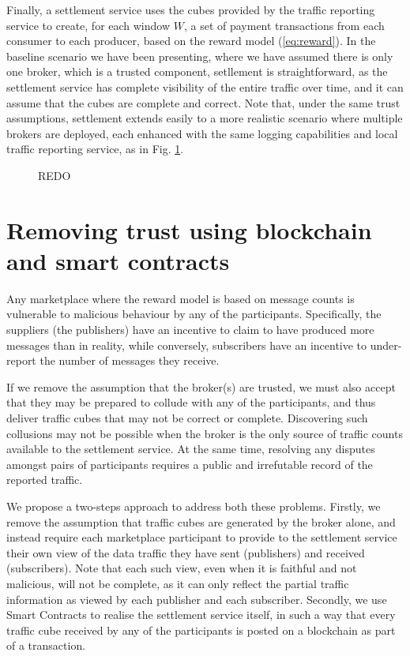 \documentclass[conference]{IEEEtran}
\begin{document}
Finally, a settlement service uses the cubes provided by the traffic reporting service to create, for each window $ W $, a set of payment transactions from each consumer to each producer, based on the reward model (\ref{eq:reward}).
In the baseline scenario we have been presenting, where we have assumed there is only one broker, which is a trusted component, setllement is straightforward, as the settlement service has complete visibility of the entire traffic over time, and it can assume that the cubes are complete and correct.
Note that, under the same trust assumptions, settlement extends easily to a more realistic scenario where multiple brokers are deployed, each enhanced with the same logging capabilities and local traffic reporting service, as in Fig. \ref{fig:cubes-in-context}.

\begin{figure}
	\caption{REDO}
	\label{fig:cubes-in-context}
\end{figure}

\section{Removing trust using blockchain and smart contracts}

Any marketplace where the reward model is based on message counts is vulnerable to malicious behaviour by any of the participants. Specifically, the suppliers (the publishers) have an incentive to claim to have produced more messages than in reality, while conversely, subscribers have an incentive to under-report the number of messages they receive.

If we remove the assumption that the broker(s) are trusted, we must also accept that they may be prepared to collude with any of the participants, and thus deliver traffic cubes that may not be correct or complete.
Discovering such collusions may not be possible when the broker is the only source of traffic counts available to the settlement service.  At the same time, resolving any disputes amongst pairs of participants requires a public and irrefutable record of the reported traffic.

We propose a two-steps approach to address both these problems.
Firstly, we remove the assumption that traffic cubes are generated by the broker alone, and instead require each marketplace participant to provide to the settlement service their own view of the data traffic they have sent (publishers) and received (subscribers).
Note that each such view, even when it is faithful and not malicious, will not be complete, as it can only reflect the partial traffic information as viewed by each publisher and each subscriber.
Secondly, we use Smart Contracts to realise the settlement service itself, in such a way that every traffic cube received by any of the participants is posted on a blockchain as part of a transaction.
\end{document}
